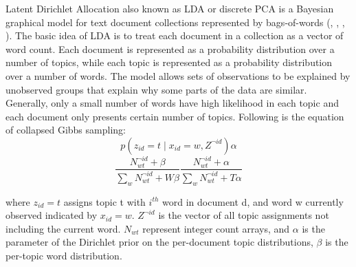 \documentclass[11pt,twoside]{report}
\begin{document}
Latent Dirichlet Allocation also known as LDA or discrete PCA is a Bayesian graphical model for text document collections represented by bags-of-words (\cite{ref26}, \cite{ref25}, \cite{ref30}, \cite{ref31}). The basic idea of LDA is to treat each document in a collection as a vector of word count. Each document is represented as a probability distribution over a number of topics, while each topic is represented as a probability distribution over a number of words. The model allows sets of observations to be explained by unobserved groups that explain why some parts of the data are similar. Generally, only a small number of words have high likelihood in each topic and each document only presents certain number of topics. Following is the equation of collapsed Gibbs sampling:
\begin{equation}
p(z_{id}=t\mid x_{id}=w,Z^{\neg id}) \alpha
\end{equation}
\begin{equation}
\frac{N_{wt}^{\neg id} + \beta}{\sum_{w}N_{wt}^{\neg id} + W\beta} \frac{N_{wt}^{\neg id} + \alpha}{\sum_{w}N_{wt}^{\neg id} + T\alpha}
\end{equation}

where $z_{id}=t$ assigns topic t with $i^{th}$ word in document d, and word w currently observed indicated by $x_{id}=w$.
$Z^{\neg id}$ is the vector of all topic assignments not including the current word. $N_{wt}$ represent integer count arrays, and $\alpha$ is the parameter of the Dirichlet prior on the per-document topic distributions, $\beta$ is the per-topic word distribution.

\end{document}
